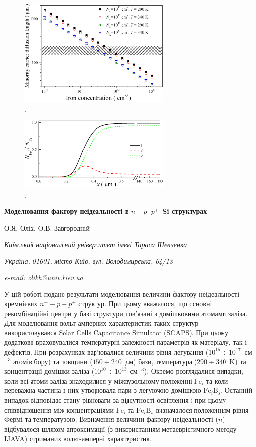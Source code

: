 \documentclass[12pt]{article}
\begin{document}
\begin{figure}
\includegraphics[width=7.5cm]{FigLn}
\caption{.
}
\label{FigLn}
\end{figure}

\begin{figure}
\includegraphics[width=7.5cm]{FigDelFei}
\caption{.
}
\label{FigDelFei}
\end{figure}

\newpage

\begin{center}
{\bfseries Моделювання фактору неідеальності в $n^+$--$p$--$p^+$--Si структурах}

О.Я. Оліх, O.В. Завгородній

\emph{Київський національний університет імені Тараса Шевченка}

\emph{Україна, 01601, місто Київ, вул. Володимирська, 64/13}

\emph{e-mail: olikh@univ.kiev.ua}

\end{center}

У цій роботі подано результати моделювання величини фактору неідеальності кремнієвих $n^+-p-p^+$ структур.
При цьому вважалося, що основні рекомбінаційні центри у базі структури пов'язані з домішковими атомами заліза.
Для моделювання вольт-амперних характеристик таких структур використовувався Solar Cells Capacitance Simulator (SCAPS). 
При цьому додатково враховувалися температурні залежності параметрів як матеріалу, так і дефектів.
При розрахунках вар'ювалися величини рівня легування ($10^{15}\div10^{17}$~см$^{-3}$ атомів бору) та товщини ($150\div240$~$\mu$м) бази,
температура ($290\div340$~K) та концентрації домішки заліза ($10^{10}\div10^{13}$~см$^{-3}$).
Окремо розглядалися випадки, коли всі атоми заліза знаходилися у міжвузольному положенні $\mathrm{Fe}_i$ та
коли переважна частина з них утворювала пари з легуючою домішкою $\mathrm{Fe}_i\mathrm{B}_s$.
Останній випадок відповідає стану рівноваги за відсутності освітлення і при цьому 
співвідношення між концентраціями  $\mathrm{Fe}_i$ та $\mathrm{Fe}_i\mathrm{B}_s$ визначалося положенням
рівня Фермі та температурою.
Визначення величини фактору неідеальності ($n$) відбувалося шляхом апроксимації (з використанням
метаеврістичного методу IJAVA) отриманих вольт-амперні характеристик.
\end{document}
